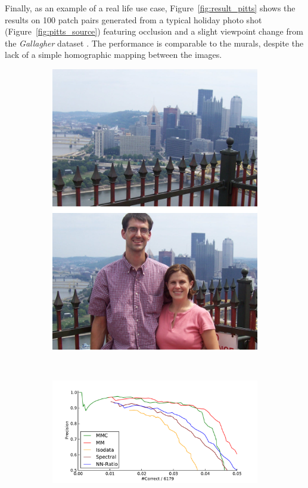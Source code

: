 Finally, as an example of a real life use case, 
Figure~\ref{fig:result_pitts} shows the results on 100 patch pairs 
generated from a typical holiday photo shot 
(Figure~\ref{fig:pitts_source}) featuring occlusion and a slight 
viewpoint change from the \emph{Gallagher} dataset \cite{gallagher2008}.  
The performance is comparable to the murals, despite the lack of a 
simple homographic mapping between the images.
%
\begin{figure}[htb]
    \centering
    \begin{subfigure}[c]{.18\textwidth}
        \includegraphics[width=\textwidth]{images/pitts}
	\end{subfigure}%
	~%
    \begin{subfigure}[c]{.76\textwidth}
    \includegraphics[width=1\columnwidth]{images/result_pitts}

\end{subfigure}
\end{figure}
